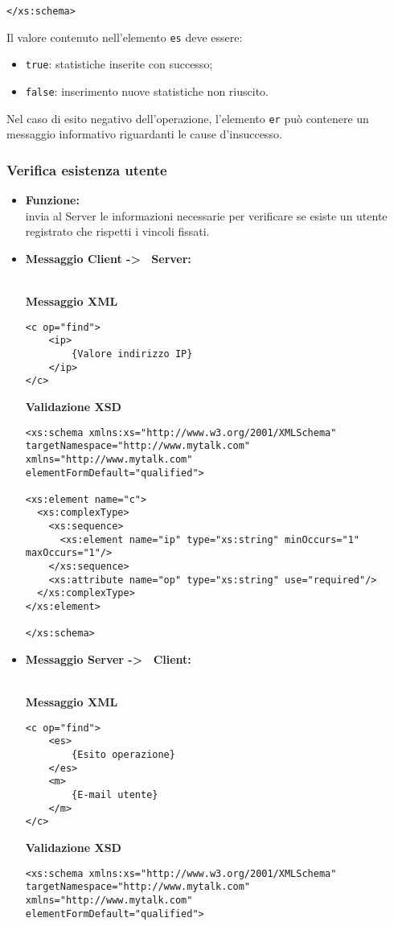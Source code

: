 {{\begin{itemize}
{\begin{lstlisting}
</xs:schema>
				\end{lstlisting}
				Il valore contenuto nell'elemento \texttt{es} deve essere:
				\begin{itemize}
					\item \texttt{true}: statistiche inserite con successo;
					\item \texttt{false}: inserimento nuove statistiche non riuscito.
				\end{itemize}
				Nel caso di esito negativo dell'operazione, l'elemento \texttt{er} può contenere un messaggio informativo riguardanti le cause d'insuccesso.
				}
		\end{itemize}
	}%
	
	\subsubsection{Verifica esistenza utente}{
	\label{opCEus}
		\begin{itemize}
			\item[] \textbf{Funzione:}{\\
				invia al Server le informazioni necessarie per verificare se esiste un utente registrato che rispetti i vincoli fissati.
				}
			
			\item[] \textbf{Messaggio Client -\textgreater~ Server:}{\\
			\textbf{Messaggio XML}\\
				\begin{lstlisting}
<c op="find">
	<ip>
		{Valore indirizzo IP}
	</ip>
</c>
				\end{lstlisting}
				\textbf{Validazione XSD}\\
				\begin{lstlisting}
<xs:schema xmlns:xs="http://www.w3.org/2001/XMLSchema"
targetNamespace="http://www.mytalk.com"
xmlns="http://www.mytalk.com"
elementFormDefault="qualified">

<xs:element name="c">
  <xs:complexType>
    <xs:sequence>
      <xs:element name="ip" type="xs:string" minOccurs="1" maxOccurs="1"/>
    </xs:sequence>
    <xs:attribute name="op" type="xs:string" use="required"/>
  </xs:complexType>
</xs:element>

</xs:schema>
				\end{lstlisting}
				}
				
				\item[] \textbf{Messaggio Server -\textgreater~ Client:}{\\
				\textbf{Messaggio XML}\\
				\begin{lstlisting}
<c op="find">
	<es>
		{Esito operazione}
	</es>
	<m>
		{E-mail utente}
	</m>
</c>
				\end{lstlisting}
				\textbf{Validazione XSD}\\
				\begin{lstlisting}
<xs:schema xmlns:xs="http://www.w3.org/2001/XMLSchema"
targetNamespace="http://www.mytalk.com"
xmlns="http://www.mytalk.com"
elementFormDefault="qualified">


\end{lstlisting}}
\end{itemize}}}
